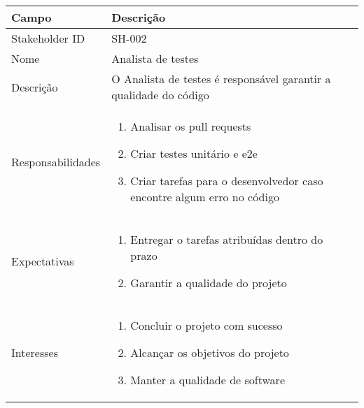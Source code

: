 \vspace{1cm}

\noindent
\begin{tabularx}{\textwidth}{| l | X |}
\hline
Campo             & Descrição                                                                                                                                                                           \\ \hline
Stakeholder ID    & SH-002                                                                                                                                                                              \\ \hline
Nome              & Analista de testes                                                                                                                                                                       \\ \hline
Descrição         & O Analista de testes é responsável garantir a qualidade do código
\\ \hline
Responsabilidades & 
\begin{enumerate}
    \item Analisar os pull requests
    \item Criar testes unitário e e2e
    \item Criar tarefas para o desenvolvedor caso encontre algum erro no código
\end{enumerate}
\\ \hline

Expectativas      &
\begin{enumerate}
    \item Entregar o tarefas atribuídas dentro do prazo
    \item Garantir a qualidade do projeto
\end{enumerate}
\\ \hline

Interesses        &
\begin{enumerate}
    \item Concluir o projeto com sucesso
    \item Alcançar os objetivos do projeto
    \item Manter a qualidade de software
\end{enumerate}
\\ \hline

\end{tabularx}

\vspace{1cm}

